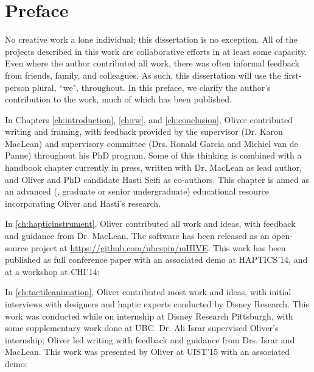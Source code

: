 
\chapter{Preface}
No creative work  %
a lone individual; this dissertation is no exception.
All of the projects described in this work are collaborative efforts in at least some capacity.
Even where the author contributed all work, there was often informal feedback from friends, family, and colleagues.
As such, this dissertation will use the first-person plural, ``we", throughout.
In this preface, we clarify the author's contribution to the work, much of which has been published.

In Chapters \ref{ch:introduction}, \ref{ch:rw}, and \ref{ch:conclusion}, Oliver contributed writing and framing, with feedback provided by the supervisor (Dr. Karon MacLean) and supervisory committee (Drs. Ronald Garcia and Michiel van de Panne) throughout his PhD program. 
Some of this thinking  is combined with a handbook chapter currently in press, written with Dr. MacLean as lead author, and Oliver and PhD candidate Hasti Seifi as co-authors.
This chapter is aimed as an advanced (\ie, graduate or senior undergraduate) educational resource incorporating Oliver and Hasti's research.

In \autoref{ch:hapticinstrument}, Oliver contributed all work and ideas, with feedback and guidance from Dr. MacLean.
The software has been released as an open-source project at \url{https://github.com/ubcspin/mHIVE}.
This work has been published as full conference paper with an associated demo at HAPTICS'14, and at a workshop at CHI'14:


\noindent
In \autoref{ch:tactileanimation}, Oliver contributed most work and ideas, with initial interviews with designers and haptic experts conducted by Disney Research.
This work was conducted while on internship at Disney Research Pittsburgh, with some supplementary work done at UBC.
Dr. Ali Israr supervised Oliver's internship; Oliver led writing with feedback and guidance from Drs. Israr and MacLean.
This work was presented by Oliver at UIST'15 with an associated demo:

